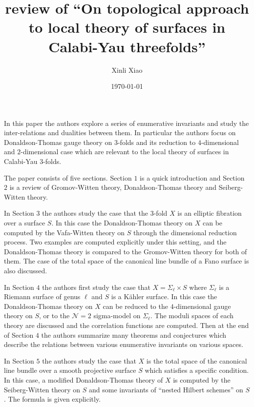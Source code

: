 \documentclass{amsart}
\title{review of ``On topological approach to local theory of surfaces in Calabi-Yau threefolds''}
\author{Xinli Xiao}
\date{\today}
\begin{document}
    
    \maketitle
    In this paper the authors explore a series of enumerative invariants and study the inter-relations and dualities between them. In particular the authors focus on Donaldson-Thomas gauge theory on $3$-folds and its reduction to $4$-dimensional and $2$-dimensional case which are relevant to the local theory of surfaces in Calabi-Yau $3$-folds.
    
    The paper consists of five sections. Section $1$ is a quick introduction and Section $2$ is a review of Gromov-Witten theory, Donaldson-Thomas theory and Seiberg-Witten theory. 
    
    In Section $3$ the authors study the case that the $3$-fold $X$ is an elliptic fibration over a surface $S$. In this case the Donaldson-Thomas theory on $X$ can be computed by the Vafa-Witten theory on $S$ through the dimensional reduction process. Two examples are computed explicitly under this setting, and the Donaldson-Thomas theory is compared to the Gromov-Witten theory for both of them. The case of the total space of the canonical line bundle of a Fano surface is also discussed.
    
    In Section $4$ the authors first study the case that $X=\Sigma_{\ell}\times S$ where $\Sigma_{\ell}$ is a Riemann surface of genus $\ell$ and $S$ is a K\"ahler surface. In this case the Donaldson-Thomas theory on $X$ can be reduced to the $4$-dimensional gauge theory on $S$, or to the $\mathcal N=2$ sigma-model on $\Sigma_{\ell}$. The moduli spaces of each theory are discussed and the correlation functions are computed. Then at the end of Section $4$ the authors summarize many theorems and conjectures which describe the relations between various enumerative invariants on various spaces. 
    
    In Section $5$ the authors study the case that $X$ is the total space of the canonical line bundle over a smooth projective surface $S$ which satisfies a specific condition. In this case, a modified Donaldson-Thomas theory of $X$ is computed by the Seiberg-Witten theory on $S$ and some invariants of ``nested Hilbert schemes'' on $S$. The formula is given explicitly.
    
    
\end{document}
